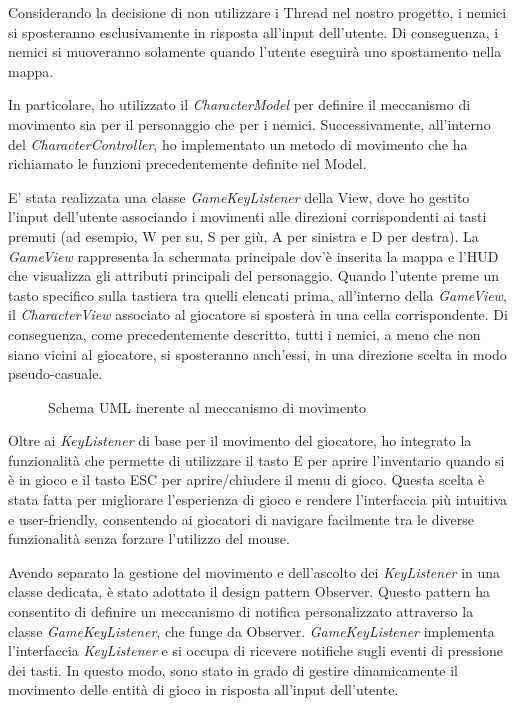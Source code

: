 \documentclass[a4paper,12pt]{report}
\begin{document}
Considerando la decisione di non utilizzare i Thread nel nostro progetto, i nemici si sposteranno esclusivamente in risposta all'input dell'utente. Di conseguenza, i nemici si muoveranno solamente quando l'utente eseguirà uno spostamento nella mappa.

In particolare, ho utilizzato il \textit{CharacterModel} per definire il meccanismo di movimento sia per il personaggio che per i nemici. Successivamente, all'interno del \textit{CharacterController}, ho implementato un metodo di movimento che ha richiamato le funzioni precedentemente definite nel Model. 

E' stata realizzata una classe \textit{GameKeyListener} della View, dove ho gestito l'input dell'utente associando i movimenti alle direzioni corrispondenti ai tasti premuti (ad esempio, W per su, S per giù, A per sinistra e D per	destra). La \textit{GameView} rappresenta la schermata principale dov'è inserita la mappa e l'HUD che visualizza gli attributi principali del personaggio.
Quando l'utente preme un tasto specifico sulla tastiera tra quelli elencati prima, all'interno della \textit{GameView}, il \textit{CharacterView} associato al giocatore si sposterà in una cella corrispondente. Di conseguenza, come precedentemente descritto, tutti i nemici, a meno che non siano vicini al giocatore, si sposteranno anch'essi, in una direzione scelta in modo pseudo-casuale.

\begin{figure}[H]
	\centering
	
	\caption{Schema UML inerente al meccanismo di movimento}
	\label{fig:the-exiled-movement-uml}
\end{figure}

Oltre ai \textit{KeyListener} di base per il movimento del giocatore, ho integrato la funzionalità che permette di utilizzare il tasto E per aprire l'inventario quando si è in gioco e il tasto ESC per aprire/chiudere il menu di gioco. Questa scelta è stata fatta per migliorare l'esperienza di gioco e rendere l'interfaccia più intuitiva e user-friendly, consentendo ai giocatori di navigare facilmente tra le diverse funzionalità senza forzare l'utilizzo del mouse.

Avendo separato la gestione del movimento e dell'ascolto dei \textit{KeyListener} in una classe dedicata, è stato adottato il design pattern Observer. Questo pattern ha consentito di definire un meccanismo di notifica personalizzato attraverso la classe \textit{GameKeyListener}, che funge da Observer. \textit{GameKeyListener} implementa l'interfaccia \textit{KeyListener} e si occupa di ricevere notifiche sugli eventi di pressione dei tasti. In questo modo, sono stato in grado di gestire dinamicamente il movimento delle entità di gioco in risposta all'input dell'utente.
\end{document}
